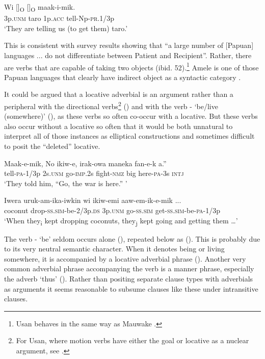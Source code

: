 \ea%
\label{ex:x932}
\gll Wi  []\textsubscript{O}  []\textsubscript{O}  maak-i-mik. \\
     3p.\textsc{unm}  taro  1p.\textsc{acc}  tell-Np-\textsc{pr}.1/3p \\
\glt `They are telling us (to get them) taro.'
\z

This is consistent with  survey results showing that ``a large number of [Papuan] languages ... do not differentiate between Patient and Recipient''. Rather, there are verbs that are capable of taking two objects (ibid. 52).\footnote{Usan behaves in the same way as Mauwake \citep[160]{Reesink1987}.} Amele is one of those Papuan languages that clearly have indirect object as a syntactic category \citep[69]{Roberts1987}.

It could be argued that a locative adverbial is an argument rather than a peripheral with the directional verbs\footnote{For Usan, where motion verbs have either the goal or locative as a nuclear argument, see \citet[130]{Reesink1987}.} () and with the verb - `be/live (somewhere)' (), as these verbs so often co-occur with a locative. But these verbs also occur without a locative so often that it would be both unnatural to interpret all of those instances as elliptical constructions and sometimes difficult to posit the ``deleted'' locative. 

\ea%
\label{ex:x1456}
\gll Maak-e-mik,  {\textquotedbl}No  ikiw-e,  irak-owa  maneka fan-e-k  a.'' \\
     tell-\textsc{pa}-1/3p  2s.\textsc{unm}  go-\textsc{imp}.2s  fight-\textsc{nmz}  big here-\textsc{pa}-3s  \textsc{intj} \\
\glt `They told him, ``Go, the war is here.'' '
\z

\ea%
\label{ex:x1457}
\gll Iwera  uruk-am-ika-iwkin  wi  ikiw-emi aaw-em-ik-e-mik ...\\
     coconut  drop-\textsc{ss}.\textsc{sim}-be-2/3p.\textsc{ds}  3p.\textsc{unm}  go-\textsc{ss}.\textsc{sim} get-\textsc{ss}.\textsc{sim}-be-\textsc{pa}-1/3p\\
\glt `When they\textsubscript{i} kept dropping coconuts, they\textsubscript{j} kept going and getting them {\dots}'
\z

The verb - `be' seldom occurs alone (), repeated below as (). This is probably due to its very neutral semantic character. When it denotes being or living somewhere, it is accompanied by a locative adverbial phrase (). Another very common adverbial phrase accompanying the verb is a manner phrase, especially the adverb  `thus' (). Rather than positing separate clause types with adverbials as arguments it seems reasonable to subsume clauses like these under intransitive clauses.

